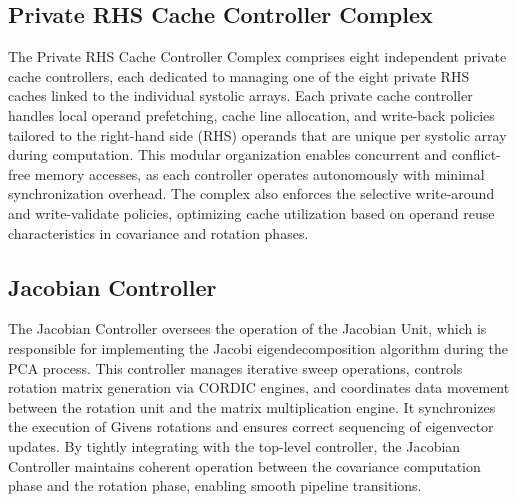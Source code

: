 \subsection{Private RHS Cache Controller Complex}
The Private RHS Cache Controller Complex comprises eight independent private cache controllers, each dedicated to managing one of the eight private RHS caches linked to the individual systolic arrays. Each private cache controller handles local operand prefetching, cache line allocation, and write-back policies tailored to the right-hand side (RHS) operands that are unique per systolic array during computation. This modular organization enables concurrent and conflict-free memory accesses, as each controller operates autonomously with minimal synchronization overhead. The complex also enforces the selective write-around and write-validate policies, optimizing cache utilization based on operand reuse characteristics in covariance and rotation phases.

\subsection{Jacobian Controller}
The Jacobian Controller oversees the operation of the Jacobian Unit, which is responsible for implementing the Jacobi eigendecomposition algorithm during the PCA process. This controller manages iterative sweep operations, controls rotation matrix generation via CORDIC engines, and coordinates data movement between the rotation unit and the matrix multiplication engine. It synchronizes the execution of Givens rotations and ensures correct sequencing of eigenvector updates. By tightly integrating with the top-level controller, the Jacobian Controller maintains coherent operation between the covariance computation phase and the rotation phase, enabling smooth pipeline transitions.

